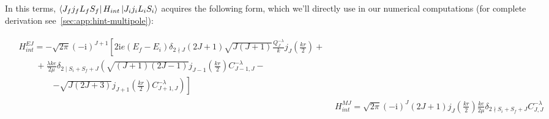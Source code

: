 In this terms, $\bra{J_f j_f L_f S_f} H_{int} \ket{J_i j_i L_i S_i}$ acquires the following form, which we'll directly use in our numerical computations (for complete derivation see~\cref{sec:app:hint-multipole}):

\begin{align}
    \begin{split}
        &H_{int}^{EJ} = -\sqrt{2\pi} (- \mathrm{i})^{J+1} \left[ 2 \mathrm{i} e (E_f-E_i) \delta_{2 \nmid J} (2J+1) \sqrt{J(J+1)} \frac{Q_{J}^{- \lambda}}{k} j_{J}(\frac{kr}{2}) + \right.\\
        &\qquad +  \frac{\lambda k e}{2 \mu} \delta_{2 \mid S_i + S_f + J} \left(  \sqrt{(J+1)(2J-1)} j_{J-1}(\frac{kr}{2}) C_{J-1, J}^{- \lambda} -\right. \\
        &\qquad\qquad\left.\left.- \sqrt{J(2J+3)} j_{J+1}(\frac{kr}{2}) C_{J+1, J}^{- \lambda} \right) \right]
    \end{split} \\
    &H_{int}^{MJ} = \sqrt{2\pi} (- \mathrm{i})^{J} (2J+1) j_J(\frac{kr}{2}) \frac{k e}{2 \mu} \delta_{2 \nmid S_i + S_f +J} C_{J, J}^{- \lambda}
\end{align}
